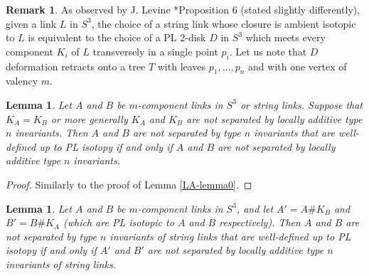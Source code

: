 \documentclass[a4paper,12pt,reqno,oneside]{amsart} %
\theoremstyle{plain}
\newtheorem{lemma}[theorem]{Lemma}
\theoremstyle{definition}
\newtheorem{remark}[theorem]{Remark}
\theoremstyle{named}
\renewcommand{\:}{\colon}
\begin{document}
\begin{remark}
As observed by J. Levine \cite{Le0}*{Proposition 6 (stated slightly differently)}, given a link $L$ in $S^3$, 
the choice of a string link whose closure is ambient isotopic to $L$ is equivalent to the choice of a PL 
$2$-disk $D$ in $S^3$ which meets every component $K_i$ of $L$ transversely in a single point $p_i$.
Let us note that $D$ deformation retracts onto a tree $T$ with leaves $p_1,\dots,p_n$ and with one vertex of valency $m$.
\end{remark}

\begin{lemma} \label{LA-lemma1}
Let $A$ and $B$ be $m$-component links in $S^3$ or string links.
Suppose that $K_A=K_B$ or more generally $K_A$ and $K_B$ are not separated by locally additive type $n$ invariants.
Then $A$ and $B$ are not separated by type $n$ invariants that are well-defined up to PL isotopy
if and only if $A$ and $B$ are not separated by locally additive type $n$ invariants.
\end{lemma}

\begin{proof} Similarly to the proof of Lemma \ref{LA-lemma0}.
\end{proof}

\begin{lemma} \label{LA-lemma2}
Let $A$ and $B$ be $m$-component links in $S^3$, and let $A'=A\#K_B$ and $B'=B\#K_A$
(which are PL isotopic to $A$ and $B$ respectively).
Then $A$ and $B$ are not separated by type $n$ invariants of string links that are well-defined up to PL isotopy
if and only if $A'$ and $B'$ are not separated by locally additive type $n$ invariants of string links.
\end{lemma}
\end{document}

